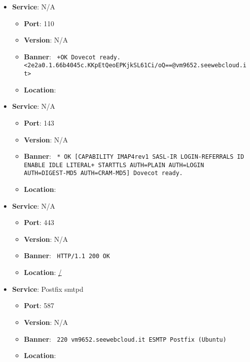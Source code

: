 \documentclass{article}
\begin{document}
\begin{itemize}
        \item \textbf{Service}: N/A
        \begin{itemize}
            \item \textbf{Port}: 110
            \item \textbf{Version}:  N/A 
            \item \textbf{Banner}: \texttt{ +OK Dovecot ready. <2e2a0.1.66b4045c.KKpEtQeoEPKjkSL61Ci/oQ==@vm9652.seewebcloud.it> }
            \item \textbf{Location}: \href{  }{  }
        \end{itemize}
    
        \item \textbf{Service}: N/A
        \begin{itemize}
            \item \textbf{Port}: 143
            \item \textbf{Version}:  N/A 
            \item \textbf{Banner}: \texttt{ * OK [CAPABILITY IMAP4rev1 SASL-IR LOGIN-REFERRALS ID ENABLE IDLE LITERAL+ STARTTLS AUTH=PLAIN AUTH=LOGIN AUTH=DIGEST-MD5 AUTH=CRAM-MD5] Dovecot ready. }
            \item \textbf{Location}: \href{  }{  }
        \end{itemize}
    
        \item \textbf{Service}: N/A
        \begin{itemize}
            \item \textbf{Port}: 443
            \item \textbf{Version}:  N/A 
            \item \textbf{Banner}: \texttt{ HTTP/1.1 200 OK
 }
            \item \textbf{Location}: \href{ / }{ / }
        \end{itemize}
    
        \item \textbf{Service}: Postfix smtpd
        \begin{itemize}
            \item \textbf{Port}: 587
            \item \textbf{Version}:  N/A 
            \item \textbf{Banner}: \texttt{ 220 vm9652.seewebcloud.it ESMTP Postfix (Ubuntu)
 }
            \item \textbf{Location}: \href{  }{  }
        \end{itemize}
    

\end{itemize}
\end{document}
